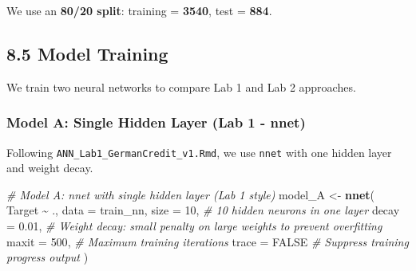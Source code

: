 \documentclass[
]{article}
\newenvironment{Shaded}{\begin{snugshade}}{\end{snugshade}}
\newcommand{\AttributeTok}[1]{\textcolor[rgb]{0.13,0.29,0.53}{#1}}
\newcommand{\CommentTok}[1]{\textcolor[rgb]{0.56,0.35,0.01}{\textit{#1}}}
\newcommand{\ConstantTok}[1]{\textcolor[rgb]{0.56,0.35,0.01}{#1}}
\newcommand{\DecValTok}[1]{\textcolor[rgb]{0.00,0.00,0.81}{#1}}
\newcommand{\FloatTok}[1]{\textcolor[rgb]{0.00,0.00,0.81}{#1}}
\newcommand{\FunctionTok}[1]{\textcolor[rgb]{0.13,0.29,0.53}{\textbf{#1}}}
\newcommand{\NormalTok}[1]{#1}
\newcommand{\OtherTok}[1]{\textcolor[rgb]{0.56,0.35,0.01}{#1}}
\newcommand{\SpecialCharTok}[1]{\textcolor[rgb]{0.81,0.36,0.00}{\textbf{#1}}}
\begin{document}
\begin{Shaded}
\end{Shaded}

We use an \textbf{80/20 split}: training = \textbf{3540}, test =
\textbf{884}.

\subsection{8.5 Model Training}\label{model-training}

We train two neural networks to compare Lab 1 and Lab 2 approaches.

\subsubsection{Model A: Single Hidden Layer (Lab 1 -
nnet)}\label{model-a-single-hidden-layer-lab-1---nnet}

Following \texttt{ANN\_Lab1\_GermanCredit\_v1.Rmd}, we use \texttt{nnet}
with one hidden layer and weight decay.

\begin{Shaded}
\begin{Highlighting}[]
\CommentTok{\# Model A: nnet with single hidden layer (Lab 1 style)}
\NormalTok{model\_A }\OtherTok{\textless{}{-}} \FunctionTok{nnet}\NormalTok{(}
\NormalTok{  Target }\SpecialCharTok{\textasciitilde{}}\NormalTok{ .,}
  \AttributeTok{data =}\NormalTok{ train\_nn,}
  \AttributeTok{size =} \DecValTok{10}\NormalTok{,        }\CommentTok{\# 10 hidden neurons in one layer}
  \AttributeTok{decay =} \FloatTok{0.01}\NormalTok{,     }\CommentTok{\# Weight decay: small penalty on large weights to prevent overfitting}
  \AttributeTok{maxit =} \DecValTok{500}\NormalTok{,      }\CommentTok{\# Maximum training iterations}
  \AttributeTok{trace =} \ConstantTok{FALSE}     \CommentTok{\# Suppress training progress output}
\NormalTok{)}
\end{Highlighting}
\end{Shaded}
\end{document}
